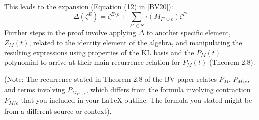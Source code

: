 \documentclass{article}
\newcommand{\tauinv}{\tau} %
\begin{document}
This leads to the expansion (Equation (12) in [BV20]):
$$ \Delta(\zeta^E) = \zeta^{E \setminus e} + \sum_{F' \in S} \tauinv(M_{F' \cup e}) \zeta^{F'} $$
Further steps in the proof involve applying $\Delta$ to another specific element, $Z_M(t)$, related to the identity element of the algebra, and manipulating the resulting expressions using properties of the KL basis and the $P_M(t)$ polynomial to arrive at their main recurrence relation for $P_M(t)$ (Theorem 2.8).

(Note: The recurrence stated in Theorem 2.8 of the BV paper relates $P_M$, $P_{M \setminus e}$, and terms involving $P_{M_{F'\cup e}}$, which differs from the formula involving contraction $P_{M/e}$ that you included in your LaTeX outline. The formula you stated might be from a different source or context).
\end{document}
